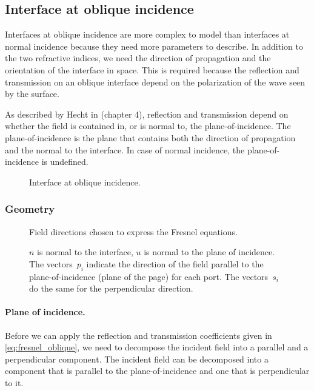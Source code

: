 
\subsection{Interface at oblique incidence}
\label{sec:interface_at_oblique_incidence}
Interfaces at oblique incidence are more complex to model than interfaces at normal incidence because they need more parameters to describe.
In addition to the two refractive indices, we need the direction of propagation and the orientation of the interface in space.
This is required because the reflection and transmission on an oblique interface depend on the polarization of the wave seen by the surface.

As described by Hecht in \cite{hecht2002optics} (chapter 4), reflection and transmission depend on whether the field is contained in, or is normal to, the plane-of-incidence.
The plane-of-incidence is the plane that contains both the direction of propagation and the normal to the interface.
In case of normal incidence, the plane-of-incidence is undefined.
\begin{figure}[hbtp]
    \centering
    \caption{\label{fig:net_interface_oblique}Interface at oblique incidence.}
\end{figure}

\subsubsection{Geometry}

\begin{figure}[hbtp]
    \centering
    
    \caption{\label{fig:fresnel_directions}Field directions chosen to express the Fresnel equations.}
    \caption*{
        $n$ is normal to the interface, $u$ is normal to the plane of incidence.
        The vectors~$p_i$ indicate the direction of the field parallel to the plane-of-incidence (plane of the page) for each port.  The vectors~$s_i$ do the same for the perpendicular direction.
    }
\end{figure}

\paragraph{Plane of incidence.}
Before we can apply the reflection and transmission coefficients given in \cref{eq:fresnel_oblique}, we need to decompose the incident field into a parallel and a perpendicular component.
The incident field can be decomposed into a component that is parallel to the plane-of-incidence and one that is perpendicular to it.

